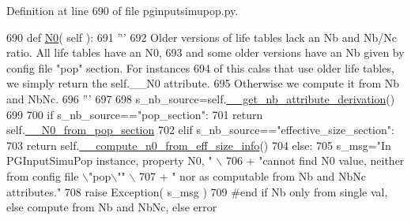 Definition at line 690 of file pginputsimupop.\+py.


\begin{DoxyCode}
690     \textcolor{keyword}{def }\hyperlink{classnegui_1_1pginputsimupop_1_1PGInputSimuPop_a7fd0bd28a9b4b0468f704db0ac882310}{N0}( self ):
691         \textcolor{stringliteral}{'''}
692 \textcolor{stringliteral}{        Older versions of life tables lack an Nb and Nb/Nc ratio.  All life tables have an N0,}
693 \textcolor{stringliteral}{        and some older versions have an Nb given by config file "pop" section.  For instances }
694 \textcolor{stringliteral}{        of this calss that use older life tables, we simply return the self.\_\_N0 attribute.  }
695 \textcolor{stringliteral}{        Otherwise we compute it from Nb and NbNc.}
696 \textcolor{stringliteral}{        '''}
697 
698         s\_nb\_source=self.\hyperlink{classnegui_1_1pginputsimupop_1_1PGInputSimuPop_ab22ca7220fa560cf8c7b4d8b6bcb87f3}{\_\_get\_nb\_attribute\_derivation}()
699 
700         \textcolor{keywordflow}{if} s\_nb\_source==\textcolor{stringliteral}{"pop\_section"}:
701             \textcolor{keywordflow}{return} self.\hyperlink{classnegui_1_1pginputsimupop_1_1PGInputSimuPop_af25160fc2d3417eb257a7ab28f6bc19d}{\_\_N0\_from\_pop\_section}
702         \textcolor{keywordflow}{elif} s\_nb\_source==\textcolor{stringliteral}{"effective\_size\_section"}:         
703             \textcolor{keywordflow}{return} self.\hyperlink{classnegui_1_1pginputsimupop_1_1PGInputSimuPop_abd206373a3765732d391dfb291398b57}{\_\_compute\_n0\_from\_eff\_size\_info}()
704         \textcolor{keywordflow}{else}:
705             s\_msg=\textcolor{stringliteral}{"In PGInputSimuPop instance, property N0, "} \(\backslash\)
706                     + \textcolor{stringliteral}{"cannot find N0 value, neither from config file \(\backslash\)"pop\(\backslash\)""} \(\backslash\)
707                     + \textcolor{stringliteral}{" nor as computable from Nb and NbNc attributes."}
708             \textcolor{keywordflow}{raise} Exception( s\_msg )
709         \textcolor{comment}{#end if Nb only from single val, else compute from Nb and NbNc, else error}
\end{DoxyCode}
